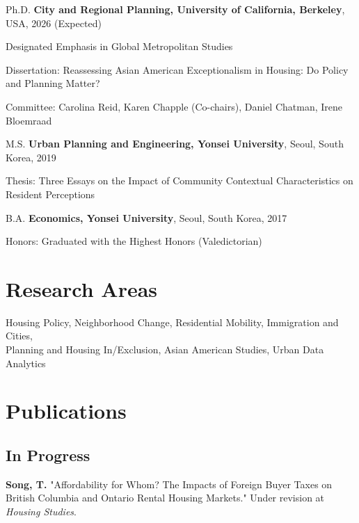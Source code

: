 \documentclass[12pt,letterpaper]{report}
\newcommand{\listitemspace}{0.4em}
\renewenvironment{itemize}
{\begin{list}{}{\setlength{\leftmargin}{0.5em}
                \setlength{\parskip}{0em}
                \setlength{\itemsep}{\listitemspace}
                \setlength{\parsep}{\listitemspace}}}
{\end{list}}
\begin{document}
    \begin{tablist}
      \item[Ph.D.] \tab{}\textbf{City and Regional Planning, University of California, Berkeley}, USA, 2026 (Expected)
        \item \tab{}Designated Emphasis in Global Metropolitan Studies
      \begin{itemize}
        \item Dissertation: Reassessing Asian American Exceptionalism in Housing: Do Policy and Planning Matter?
        \vspace{-0.6em}
        \item Committee: Carolina Reid, Karen Chapple (Co-chairs), Daniel Chatman, Irene Bloemraad
      \end{itemize}
      \item[M.S.] \tab{}\textbf{Urban Planning and Engineering, Yonsei University}, Seoul, South Korea, 2019
      \begin{itemize}
        \item Thesis: Three Essays on the Impact of Community Contextual Characteristics on Resident Perceptions
    \end{itemize}
      \item[B.A.] \tab{}\textbf{Economics, Yonsei University}, Seoul, South Korea, 2017
      \begin{itemize}
        \item Honors: Graduated with the Highest Honors (Valedictorian)
      \end{itemize}
    \end{tablist}
    
    \section*{Research Areas}
      Housing Policy, Neighborhood Change, Residential Mobility, Immigration and Cities,\\
      Planning and Housing In/Exclusion, Asian American Studies, Urban Data Analytics
  
    \section*{Publications}
    \subsection*{In Progress}
        \textbf{Song, T.} "Affordability for Whom? The Impacts of Foreign Buyer Taxes on British Columbia and Ontario Rental Housing Markets." Under revision at \emph{Housing Studies}.
\end{document}
